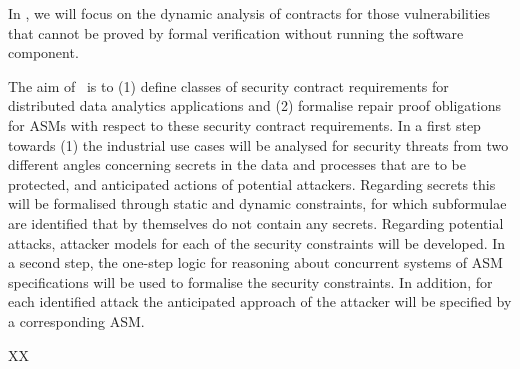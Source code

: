 \begin{Workpackage}{\thewpno}
\begin{Task}

\TaskResults{%
}
\TaskHeader{}

\end{Task}


\begin{Task}

\TaskResults{%
}
\TaskHeader{}

In \theTask, we will focus on the dynamic analysis of contracts for
those vulnerabilities that cannot be proved by formal verification
without running the software component.
\end{Task}

\begin{Task}

\TaskResults{%
}
\TaskHeader{}

The aim of \theTask\ is to (1) define classes of security contract requirements for distributed data analytics applications and (2) formalise repair proof obligations for ASMs with respect to these security contract requirements. In a first step towards (1) the industrial use cases will be analysed for security threats from two different angles concerning secrets in the data and processes that are to be protected, and anticipated actions of potential attackers. Regarding secrets this will be formalised through static and dynamic constraints, for which subformulae are identified that by themselves do not contain any secrets. Regarding potential attacks, attacker models for each of the security constraints will be developed. In a second step, the one-step logic for reasoning about concurrent systems of ASM specifications will be used to formalise the security constraints. In addition, for each identified attack the anticipated approach of the attacker will be specified by a corresponding ASM.
\end{Task}


\begin{WPDeliverables}
  \begin{compactitem}
    \item XX
\end{compactitem}
\end{WPDeliverables}
\end{Workpackage}
